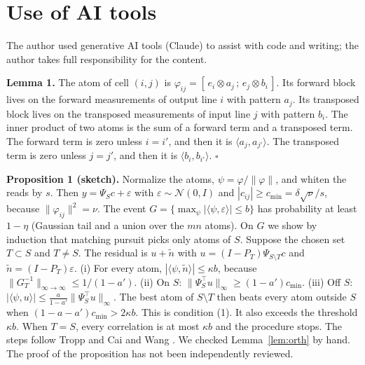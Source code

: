 \documentclass[journal]{IEEEtran}
\begin{document}
\section*{Use of AI tools}
The author used generative AI tools (Claude) to assist with code and writing; the author takes full responsibility for the content.


\label{app:proof}
\textbf{Lemma 1.} The atom of cell $(i,j)$ is $\varphi_{ij}=[\,e_i\otimes a_j\,;\,e_j\otimes b_i\,]$. Its forward block lives on the forward measurements of output line $i$ with pattern $a_j$. Its transposed block lives on the transposed measurements of input line $j$ with pattern $b_i$. The inner product of two atoms is the sum of a forward term and a transposed term. The forward term is zero unless $i=i'$, and then it is $\langle a_j,a_{j'}\rangle$. The transposed term is zero unless $j=j'$, and then it is $\langle b_i,b_{i'}\rangle$. $\square$

\textbf{Proposition 1 (sketch).} Normalize the atoms, $\psi=\varphi/\|\varphi\|$, and whiten the reads by $s$. Then $y=\Psi_S c+\varepsilon$ with $\varepsilon\sim\mathcal N(0,I)$ and $|c_{ij}|\ge c_{\min}=\delta\sqrt{\nu}/s$, because $\|\varphi_{ij}\|^2=\nu$. The event $G=\{\max_\psi|\langle\psi,\varepsilon\rangle|\le b\}$ has probability at least $1-\eta$ (Gaussian tail and a union over the $mn$ atoms). On $G$ we show by induction that matching pursuit picks only atoms of $S$. Suppose the chosen set $T\subset S$ and $T\ne S$. The residual is $u+\tilde n$ with $u=(I-P_T)\Psi_{S\setminus T}c$ and $\tilde n=(I-P_T)\varepsilon$.
(i) For every atom, $|\langle\psi,\tilde n\rangle|\le\kappa b$, because $\|G_T^{-1}\|_{\infty\to\infty}\le 1/(1-a')$.
(ii) On $S$: $\|\Psi_S^{\top}u\|_\infty\ge(1-a')c_{\min}$.
(iii) Off $S$: $|\langle\psi,u\rangle|\le\frac{a}{1-a'}\|\Psi_S^{\top}u\|_\infty$.
The best atom of $S\setminus T$ then beats every atom outside $S$ when $(1-a-a')c_{\min}>2\kappa b$. This is condition (1). It also exceeds the threshold $\kappa b$. When $T=S$, every correlation is at most $\kappa b$ and the procedure stops. The steps follow Tropp \cite{tropp2004} and Cai and Wang \cite{caiwang2011}. We checked Lemma~\ref{lem:orth} by hand. The proof of the proposition has not been independently reviewed.



\end{document}
